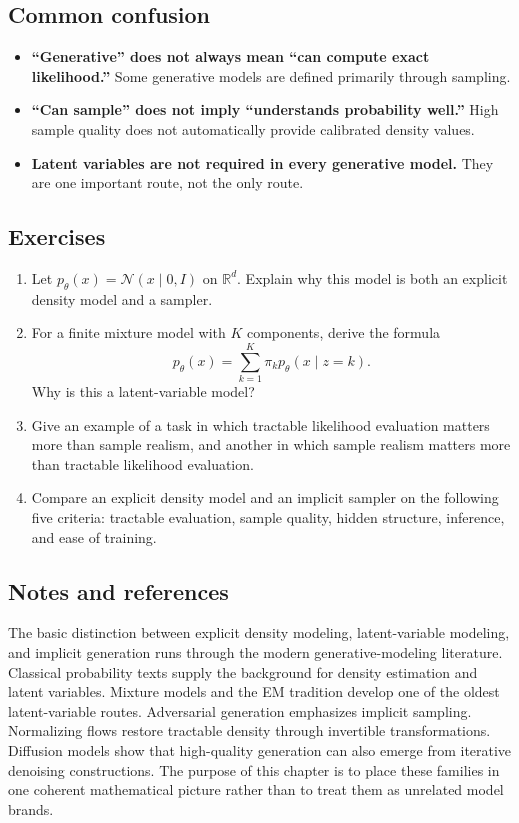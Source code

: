 \subsection*{Common confusion}

\begin{itemize}
    \item \textbf{``Generative'' does not always mean ``can compute exact likelihood.''} Some generative models are defined primarily through sampling.
    \item \textbf{``Can sample'' does not imply ``understands probability well.''} High sample quality does not automatically provide calibrated density values.
    \item \textbf{Latent variables are not required in every generative model.} They are one important route, not the only route.
\end{itemize}

\subsection*{Exercises}

\begin{enumerate}
    \item Let $p_\theta(x)=\mathcal{N}(x\mid 0,I)$ on $\mathbb{R}^d$. Explain why this model is both an explicit density model and a sampler.
    \item For a finite mixture model with $K$ components, derive the formula
    \[
    p_\theta(x)=\sum_{k=1}^K \pi_k p_\theta(x\mid z=k).
    \]
    Why is this a latent-variable model?
    \item Give an example of a task in which tractable likelihood evaluation matters more than sample realism, and another in which sample realism matters more than tractable likelihood evaluation.
    \item Compare an explicit density model and an implicit sampler on the following five criteria: tractable evaluation, sample quality, hidden structure, inference, and ease of training.
\end{enumerate}

\subsection*{Notes and references}

The basic distinction between explicit density modeling, latent-variable modeling, and implicit generation runs through the modern generative-modeling literature.
Classical probability texts supply the background for density estimation and latent variables.
Mixture models and the EM tradition develop one of the oldest latent-variable routes.
Adversarial generation emphasizes implicit sampling.
Normalizing flows restore tractable density through invertible transformations.
Diffusion models show that high-quality generation can also emerge from iterative denoising constructions.
The purpose of this chapter is to place these families in one coherent mathematical picture rather than to treat them as unrelated model brands.
